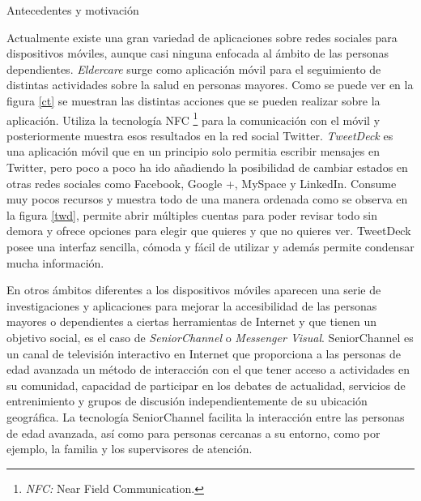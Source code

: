 \documentclass[12pt,a4paper,spanish,oneside]{report}
\makeatletter
\renewcommand{\subsection}{
  \@startsection{subsection}{2}{0mm}{2mm}
  {4.0mm}{\Large\bf}
}
\theoremstyle{plain} \newtheorem{nota}{Nota}
\makeatother
\begin{document}
\subsection{Antecedentes y motivación}
\begin{spacing}{1.5}
Actualmente existe una gran variedad de aplicaciones sobre redes sociales para 
dispositivos móviles, aunque casi ninguna enfocada al ámbito de las personas
dependientes. \emph{Eldercare} \cite{CTW} surge como aplicación móvil para el 
seguimiento de distintas actividades sobre la salud en personas mayores. Como 
se puede ver en la figura \ref{ct} se muestran las distintas acciones que se 
pueden realizar sobre la aplicación. Utiliza la tecnología NFC 
\footnote[1]{\emph{NFC:} Near Field Communication.} para la comunicación con el
 móvil y posteriormente muestra esos resultados en la red social Twitter.
\emph{TweetDeck} \cite{TD} es una aplicación móvil que en un principio solo 
permitia escribir mensajes en Twitter, pero poco a poco ha ido añadiendo la 
posibilidad de cambiar estados en otras redes sociales como Facebook, Google +,
 MySpace y LinkedIn. Consume muy pocos recursos y muestra todo de una manera 
ordenada como se observa en la figura \ref{twd}, permite abrir múltiples 
cuentas para poder revisar todo sin demora y ofrece opciones para elegir que 
quieres y que no quieres ver.  TweetDeck posee una interfaz sencilla, cómoda y 
fácil de utilizar y además permite condensar mucha información.

En otros ámbitos diferentes a los dispositivos móviles aparecen una serie de
investigaciones y aplicaciones para mejorar la accesibilidad de las personas 
mayores o dependientes a ciertas herramientas de Internet y que tienen un 
objetivo social, es el caso de \emph{SeniorChannel} o \emph{Messenger Visual}. 
SeniorChannel \cite{SEN} es un canal de televisión interactivo en Internet que
proporciona a las personas de edad avanzada un método de interacción con el que 
tener acceso a actividades en su comunidad, capacidad de participar en los 
debates de actualidad, servicios de entrenimiento y grupos de discusión 
independientemente de su ubicación geográfica. La tecnología SeniorChannel 
facilita la interacción entre las personas de edad avanzada, así como para 
personas cercanas a su entorno, como por ejemplo, la familia y los supervisores
de atención.


\end{spacing}
\end{document}
